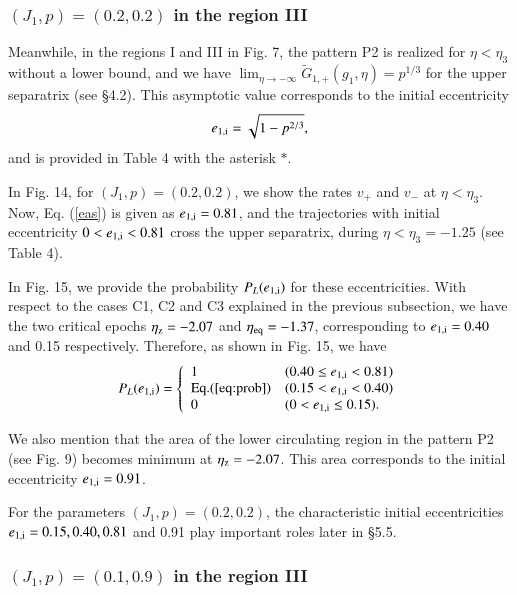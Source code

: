 \documentclass[useAMS,usenatbib,twocolumn]{mn2e}
\newcommand{\beq}{\begin{equation}}
\newcommand{\eeq}{\end{equation}}
\begin{document}
\subsubsection{$(J_1,p)=(0.2,0.2)$ in the region III}

Meanwhile, in the regions I and III in Fig. 7, the pattern P2 is realized for $\eta<\eta_3$ without a lower bound, and we have $\lim_{\eta\to -\infty} \tilde{G}_{1, +}(g_1,\eta)=p^{1/3}$ for the upper separatrix (see \S 4.2).  This asymptotic value corresponds to the initial eccentricity 
\beq
e_{\rm 1,i}=\sqrt{1-p^{2/3}}, \label{eas}
\eeq
and is provided in Table 4 with the asterisk $*$. 

In Fig. 14, for $(J_1,p)=(0.2,0.2)$,   we show the rates $v_+$ and $v_-$ at $\eta<\eta_3$.  
Now, Eq. (\ref{eas}) is given as $e_{\rm 1,i}=0.81$, and the trajectories with initial eccentricity $0<e_{\rm 1,i}<0.81$ cross the upper separatrix, during $\eta<\eta_3=-1.25$ (see Table 4).


In Fig. 15,  we provide the probability $P_L(e_{\rm 1,i})$ for these eccentricities. With respect to the cases C1, C2 and C3 explained  in the previous subsection,  we have the two critical epochs $\eta_{\rm z}=-2.07$ and $\eta_{\rm eq}=-1.37$, corresponding to $e_{\rm 1,i}=0.40$ and 0.15 respectively.   Therefore, as shown in Fig. 15, we have
\begin{eqnarray}
P_L(e_{\rm 1,i})=\left\{ \begin{array}{ll}
1 & (0.40\le e_{\rm 1,i}<0.81) \\
{\rm Eq}.(\ref{eq:prob}) & (0.15<e_{\rm 1,i}<0.40) \\
0 & (0<e_{\rm 1,i}\le0.15). \\
\end{array} \right.
\end{eqnarray}

We also mention that the  area of the lower circulating region in the pattern P2 (see Fig. 9) becomes minimum at $\eta_{\rm z}=-2.07$.  This area corresponds to the initial eccentricity $e_{\rm 1,i}=0.91$.  


For the parameters $(J_1,p)=(0.2,0.2)$, the characteristic initial eccentricities $e_{\rm 1,i}=0.15,0.40,0.81$ and 0.91 play important roles later in \S 5.5.


\subsubsection{$(J_1,p)=(0.1,0.9)$ in the region III}
\end{document}

